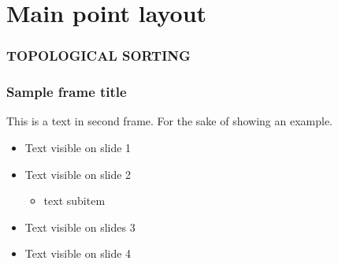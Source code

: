 \documentclass[aspectratio=169,t,xcolor=table]{beamer}
\begin{document}
\section{Main point layout}

\begin{frame}{}
    \frametitle{TOPOLOGICAL SORTING}
\end{frame}



\begin{frame}
    \frametitle{Sample frame title}
    This is a text in second frame. For the sake of showing an example.
    
    \begin{itemize}
        \item<1-> Text visible on slide 1
        \item<2-> Text visible on slide 2
        \begin{itemize}
            \item text subitem
        \end{itemize}
        \item<3> Text visible on slides 3
        \item<4-> Text visible on slide 4
    \end{itemize}
\end{frame}
\end{document}

